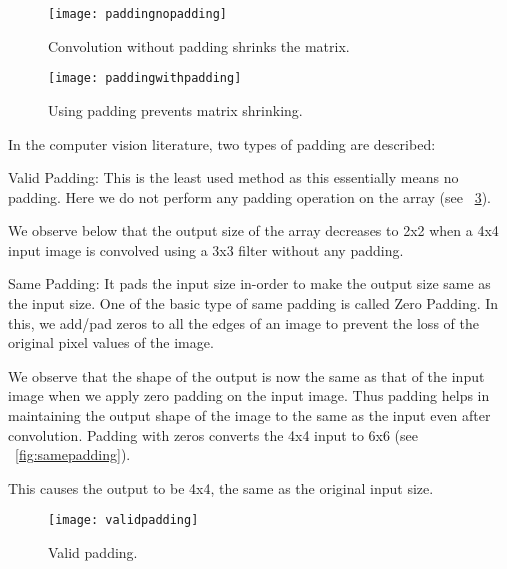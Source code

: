 	\begin{figure}[h]
		\centering
		\texttt{[image: paddingnopadding]}
		\caption[Convolution without padding shrinks the matrix]{Convolution without padding shrinks the matrix.}
		\label{fig:paddingnopadding}
	\end{figure}
	\begin{figure}[h]
		\centering
		\texttt{[image: paddingwithpadding]}
		\caption[Using padding prevents matrix shrinking]{Using padding prevents matrix shrinking.}
		\label{fig:paddingwithpadding}
	\end{figure}

In the computer vision literature, two types of padding are described:
	\begin{bulletedlist}
		\item Valid Padding: This is the least used method as this essentially means no padding.  Here we do not perform any padding operation on the array (see \figurename~\ref{fig:validpadding}).
		\begin{bulletedlist}
			\item We observe below that the output size of the array decreases to 2x2 when a 4x4 input image is convolved using a 3x3 filter without any padding.
		\end{bulletedlist}
		\item Same Padding: It pads the input size in-order to make the output size same as the input size.  One of the basic type of same padding is called Zero Padding. In this, we add/pad zeros to all the edges of an image to prevent the loss of the original pixel values of the image.
		\begin{bulletedlist}
			\item We observe that the shape of the output is now the same as that of the input image when we apply zero padding on the input image. Thus padding helps in maintaining the output shape of the image to the same as the input even after convolution.
Padding with zeros converts the 4x4 input to 6x6 (see \figurename~\ref{fig:samepadding}).
			\item This causes the output to be 4x4, the same as the original input size.
		\end{bulletedlist}
	\end{bulletedlist}

	\begin{figure}[h]
		\centering
		\texttt{[image: validpadding]}
		\caption[Valid padding]{Valid padding.}
		\label{fig:validpadding}
	\end{figure}

